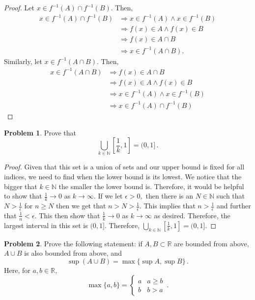 \documentclass[11pt]{article}
\theoremstyle{definition}
\newtheorem{problem}{Problem}
\newcommand{\N}{\mathbb{N}}
\newcommand{\R}{\mathbb{R}}
\begin{document}
\begin{proof}
Let $x\in f^{-1}(A)\cap f^{-1}(B)$. Then,
\begin{align*}
    x\in f^{-1}(A)\cap f^{-1}(B) &\Rightarrow x\in f^{-1}(A)\wedge x\in f^{-1}(B)\\
    &\Rightarrow f(x) \in A\wedge f(x)\in B\\
    &\Rightarrow f(x) \in A\cap B\\
    &\Rightarrow x\in f^{-1}(A\cap B).
\end{align*} Similarly, let $x\in f^{-1}(A\cap B)$. Then,
\begin{align*}
    x\in f^{-1}(A\cap B) &\Rightarrow f(x) \in A\cap B\\
    &\Rightarrow f(x)\in A\wedge f(x)\in B\\
    &\Rightarrow x\in f^{-1}(A)\wedge x\in f^{-1}(B)\\
    &\Rightarrow x\in f^{-1}(A)\cap f^{-1}(B)
\end{align*}
\end{proof}

\newpage
\begin{problem}
Prove that 
\[
\bigcup_{k \in \N} \left[ \frac{1}{k}, 1\right] = (0,1] \, .
\]
\end{problem}

\begin{proof}
Given that this set is a union of sets and our upper bound is fixed for all indices, we need to find when the lower bound is its lowest. We notice that the bigger that $k\in \N$ the smaller the lower bound is. Therefore, it would be helpful to show that $\frac{1}{k}\rightarrow 0$ as $k\rightarrow \infty$. If we let $\epsilon > 0,$ then there is an $N\in \N$ such that $N> \frac{1}{\epsilon}$ for $n \geq N$ then we get that $n> N> \frac{1}{\epsilon}.$ This implies that $n> \frac{1}{\epsilon}$ and further that $\frac{1}{n}< \epsilon$. This then show that $\frac{1}{k}\rightarrow 0$ as $k \rightarrow \infty$ as desired. Therefore, the largest interval in this set is $(0, 1]$. Therefore, $\bigcup_{k \in \N} \left[ \frac{1}{k}, 1\right] = (0,1].$
\end{proof}

\newpage
\begin{problem}
Prove the following statement: if $A, B \subset \R$ are bounded from above, $A \cup B$ is also bounded from above, and 
\[
\sup(A \cup B) = \max\{ \sup A, \sup B\} \,. 
\]
Here, for $a, b \in \R$, 
\[
\max\{ a, b\} = \begin{cases} a & a \geq b \\ b & b > a \end{cases} \,. 
\]
\end{problem}
\end{document}
